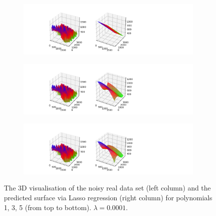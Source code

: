  \begin{figure}[!htbp]
\begin{subfigure}{\textwidth}
  \centering
  \includegraphics[width=1\linewidth]{images/surf/real_lasso_p01_nreal.png}
\end{subfigure}
\begin{subfigure}{\textwidth}
  \centering
  \includegraphics[width=1\linewidth]{images/surf/real_lasso_p03_nreal.png}
\end{subfigure}
\begin{subfigure}{\textwidth}
  \centering
  \includegraphics[width=1\linewidth]{images/surf/real_lasso_p05_nreal.png}
\end{subfigure}
\caption{The 3D visualisation of the noisy  real data set (left column) and the predicted surface via Lasso regression (right column) for polynomials 1, 3, 5 (from top to bottom). $\lambda = 0.0001$.}
\label{fig:lasso-surf-real}
\end{figure}


